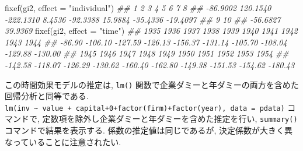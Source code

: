 \documentclass[
  letterpaper,
  xelatex,
  ja=standard, xelatex]{bxjsbook}
\newenvironment{Shaded}{\begin{snugshade}}{\end{snugshade}}
\newcommand{\AttributeTok}[1]{\textcolor[rgb]{0.40,0.45,0.13}{#1}}
\newcommand{\DocumentationTok}[1]{\textcolor[rgb]{0.37,0.37,0.37}{\textit{#1}}}
\newcommand{\FunctionTok}[1]{\textcolor[rgb]{0.28,0.35,0.67}{#1}}
\newcommand{\NormalTok}[1]{\textcolor[rgb]{0.00,0.23,0.31}{#1}}
\newcommand{\StringTok}[1]{\textcolor[rgb]{0.13,0.47,0.30}{#1}}
\begin{document}
\begin{Shaded}
\begin{Highlighting}[]
\FunctionTok{fixef}\NormalTok{(gi2, }\AttributeTok{effect =} \StringTok{"individual"}\NormalTok{)}
\DocumentationTok{\#\#         1         2         3         4         5         6         7         8 }
\DocumentationTok{\#\#  {-}86.9002  120.1540 {-}222.1310    8.4536  {-}92.3388   15.9884  {-}35.4336  {-}19.4097 }
\DocumentationTok{\#\#         9        10 }
\DocumentationTok{\#\#  {-}56.6827   39.9369}
\FunctionTok{fixef}\NormalTok{(gi2, }\AttributeTok{effect =} \StringTok{"time"}\NormalTok{)}
\DocumentationTok{\#\#    1935    1936    1937    1938    1939    1940    1941    1942    1943    1944 }
\DocumentationTok{\#\#  {-}86.90 {-}106.10 {-}127.59 {-}126.13 {-}156.37 {-}131.14 {-}105.70 {-}108.04 {-}129.88 {-}130.00 }
\DocumentationTok{\#\#    1945    1946    1947    1948    1949    1950    1951    1952    1953    1954 }
\DocumentationTok{\#\# {-}142.58 {-}118.07 {-}126.29 {-}130.62 {-}160.40 {-}162.80 {-}149.38 {-}151.53 {-}154.62 {-}180.43}
\end{Highlighting}
\end{Shaded}

この時間効果モデルの推定は, \texttt{lm()}
関数で企業ダミーと年ダミーの両方を含めた回帰分析と同等である.
\texttt{lm(inv\ \textasciitilde{}\ value\ +\ capital+0+factor(firm)+factor(year),\ data\ =\ pdata)}
コマンドで, 定数項を除外し企業ダミーと年ダミーを含めた推定を行い,
\texttt{summary()} コマンドで結果を表示する. 係数の推定値は同じであるが,
決定係数が大きく異なっていることに注意されたい.
\end{document}
